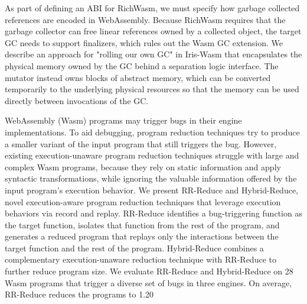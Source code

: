 \documentclass[a4paper,UKenglish]{dagrep-v2018}
\begin{document}
As part of defining an ABI for RichWasm, we must specify how garbage collected references are encoded in WebAssembly. Because RichWasm requires that the garbage collector can free linear references owned by a collected object, the target GC needs to support finalizers, which rules out the Wasm GC extension. We describe an approach for "rolling our own GC" in Iris-Wasm that encapsulates the physical memory owned by the GC behind a separation logic interface. The mutator instead owns blocks of abstract memory, which can be converted temporarily to the underlying physical resources so that the memory can be used directly between invocations of the GC.

\license
{}

WebAssembly (Wasm) programs may trigger bugs in their engine implementations. To aid debugging, program reduction techniques try to produce a smaller variant of the input program that still triggers the bug. However, existing execution-unaware program reduction techniques struggle with large and complex Wasm programs, because they rely on static information and apply syntactic transformations, while ignoring the valuable information offered by the input program’s execution behavior. We present RR-Reduce and Hybrid-Reduce, novel execution-aware program reduction techniques that leverage execution behaviors via record and replay. RR-Reduce identifies a bug-triggering function as the target function, isolates that function from the rest of the program, and generates a reduced program that replays only the interactions between the target function and the rest of the program. Hybrid-Reduce combines a complementary execution-unaware reduction technique with RR-Reduce to further reduce program size. We evaluate RR-Reduce and Hybrid-Reduce on 28 Wasm programs that trigger a diverse set of bugs in three engines. On average, RR-Reduce reduces the programs to 1.20%
\end{document}
